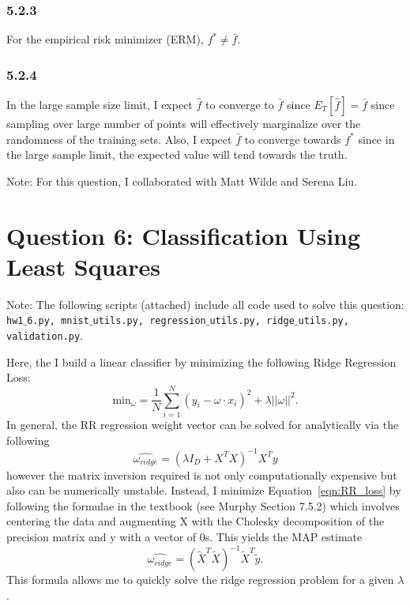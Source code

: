 \documentclass[12pt]{amsart}
\begin{document}
\subsubsection*{5.2.3}
For the empirical risk minimizer (ERM), $f^{*} \neq \bar{f}$.

\subsubsection*{5.2.4}
In the large sample size limit, I expect $\hat{f}$ to converge to $\bar{f}$ since $E_T[\hat{f}] = \bar{f}$ since sampling over large number of points will effectively marginalize over the randomness of the training sets.  Also, I expect $\bar{f}$ to converge towards $f^{*}$ since in the large sample limit, the expected value will tend towards the truth.

Note: For this question, I collaborated with Matt Wilde and Serena Liu.


\section*{Question 6: Classification Using Least Squares}

Note: The following scripts (attached) include all code used to solve this question: {\tt hw1$\_$6.py, mnist$\_$utils.py, regression$\_$utils.py, ridge$\_$utils.py, validation.py}.

Here, the I build a linear classifier by minimizing the following Ridge Regression Loss:
\begin{equation} \label{eqn:RR_loss}
\text{min}_{\omega} = \frac{1}{N} \sum_{i = 1}^N (y_i - \omega \cdot x_i)^2 + \lambda || \omega ||^2.
\end{equation}
In general, the RR regression weight vector can be solved for analytically via the following
\begin{equation} \label{eqn:RR_w}
\hat{\omega_{ridge}} = (\lambda I_D + X^T X)^{-1} X^T y
\end{equation}
however the matrix inversion required is not only computationally expensive but also can be numerically unstable.  Instead, I minimize Equation~\ref{eqn:RR_loss} by following the formulae in the textbook (see Murphy Section 7.5.2) which involves centering the data and augmenting X with the Cholesky decomposition of the precision matrix and y with a vector of 0s.  This yields the MAP estimate
\begin{equation} \label{eqn:RR_w_murphy}
\hat{\omega_{ridge}} = (\tilde{X}^T \tilde{X})^{-1} \tilde{X}^T \tilde{y}.
\end{equation}
This formula allows me to quickly solve the ridge regression problem for a given $\lambda$.
\end{document}
